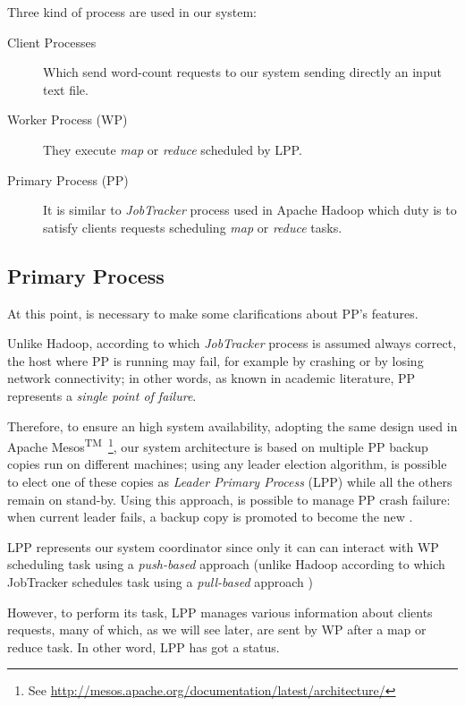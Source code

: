 \documentclass[sigchi]{acmart}
\begin{document}
Three kind of process are used in our system:

\begin{description}
\item[Client Processes] Which send word-count requests to our system sending directly an input text file. 

\item[Worker Process (WP)] They execute \textit{map} or \textit{reduce} scheduled by LPP.

\item[Primary Process (PP)] It is similar to \textit{JobTracker} process used in Apache Hadoop which duty is to satisfy clients requests scheduling \textit{map} or \textit{reduce} tasks. 
\end{description}

\subsection{Primary Process}
At this point, is necessary to make some clarifications about PP's features.

Unlike Hadoop, according to which \textit{JobTracker} process is assumed always correct, the host where PP is running may fail, for example by crashing or by losing network connectivity; in other words, as known in academic literature, PP represents a \textit{single point of failure}.

Therefore, to ensure an high system availability, adopting the same design used in Apache Mesos\textsuperscript{TM}\ \footnote{See \url{http://mesos.apache.org/documentation/latest/architecture/}}, our system architecture is based on multiple PP backup copies run on different machines; using any leader election algorithm, is possible to elect one of these copies as \textit{Leader Primary Process} (LPP) while all the others remain on stand-by. Using this approach, is possible to manage PP crash failure: when current leader fails, a backup copy is promoted to become the new . 

LPP represents our system coordinator since only it can can interact with WP scheduling task using a \textit{push-based} approach (unlike Hadoop according to which JobTracker schedules task using a \textit{pull-based} approach \cite{LARTS})

However, to perform its task, LPP manages various information about clients requests, many of which, as we will see later, are sent by WP after a map or reduce task. In other word, LPP has got a status.
\end{document}
